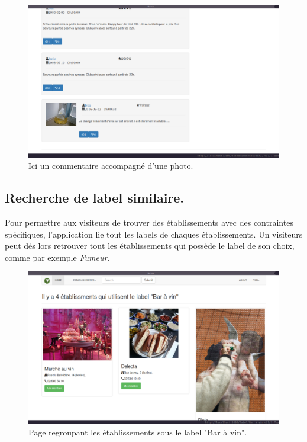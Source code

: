 \documentclass[a4paper,10pt]{article}
\begin{document}
    \begin{figure}[hbt]
        \centering
        \includegraphics[scale=0.3]{./images/picture.png}
        \caption{Ici un commentaire accompagné d'une photo.}
    \end{figure}

\subsection{Recherche de label similaire.}
    Pour permettre aux visiteurs de trouver des établissements avec des
    contraintes spécifiques, l'application lie tout les labels de chaques
    établissements. Un visiteurs peut dés lors retrouver tout les
    établissements qui possède le label de son choix, comme par exemple
    \emph{Fumeur}.

    \begin{figure}[hbt]
        \centering
        \includegraphics[scale=0.3]{./images/label.png}
        \caption{Page regroupant les établissements sous le label "Bar à vin".}
    \end{figure}
\end{document}
